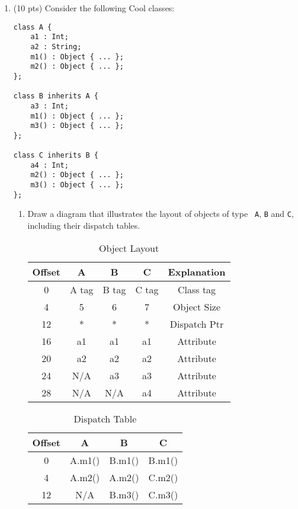 \documentclass[10pt]{article}
\begin{document}
\begin{enumerate}

\item (10 pts)
Consider the following Cool classes:

\begin{center}
\begin{minipage}{6cm}
\begin{verbatim}
class A {
    a1 : Int;
    a2 : String;
    m1() : Object { ... };
    m2() : Object { ... };
};

class B inherits A {
    a3 : Int;
    m1() : Object { ... };
    m3() : Object { ... };
};

class C inherits B {
    a4 : Int;
    m2() : Object { ... };
    m3() : Object { ... };
};
\end{verbatim}
\end{minipage}
\end{center}
\begin{enumerate}

\item Draw a diagram that illustrates the layout of objects of type {\tt
A}, {\tt B} and {\tt C}, including their dispatch tables.

\begin{table}[ht]
	\centering
	\caption{Object Layout}
	\begin{tabular}{|c|c|c|c|c|}                         \hline
		Offset & A     & B     & C     & Explanation  \\ \hline
		0      & A tag & B tag & C tag & Class tag    \\ \hline
		4      & 5     & 6     & 7     & Object Size  \\ \hline
		12     & *     & *     & *     & Dispatch Ptr \\ \hline
		16     & a1    & a1    & a1    & Attribute    \\ \hline
		20     & a2    & a2    & a2    & Attribute    \\ \hline
		24     & N/A   & a3    & a3    & Attribute    \\ \hline
		28     & N/A   & N/A   & a4    & Attribute    \\ \hline
	\end{tabular}
\end{table}

\begin{table}[ht]
	\centering
	\caption{Dispatch Table}
	\begin{tabular}{|c|c|c|c|}               \hline
		Offset & A      & B      & C      \\ \hline
		0      & A.m1() & B.m1() & B.m1() \\ \hline
		4      & A.m2() & A.m2() & C.m2() \\ \hline
		12     &  N/A   & B.m3() & C.m3() \\ \hline
	\end{tabular}
\end{table}


\end{enumerate}
\end{enumerate}
\end{document}
